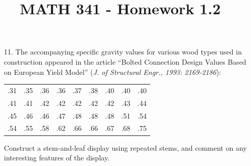 \documentclass[letterpaper,12pt]{article}
\author{}
\title{MATH 341 - Homework 1.2}
\date{} %
\begin{document}
\maketitle

\begin{enumerate}
  \item[11.]
    The accompanying specific gravity values for various wood types used in construction appeared in the article ``Bolted Connection Design Values Based on European Yield Model'' (\textit{J. of Structural Engr., 1993: 2169-2186}):
    \begin{center}
    \begin{tabular}{l l l l l l l l l}
      .31 & .35 & .36 & .36 & .37 & .38 & .40 & .40 & .40 \\
      .41 & .41 & .42 & .42 & .42 & .42 & .42 & .43 & .44 \\
      .45 & .46 & .46 & .47 & .48 & .48 & .48 & .51 & .54 \\
      .54 & .55 & .58 & .62 & .66 & .66 & .67 & .68 & .75
    \end{tabular}
    \end{center}
    Construct a stem-and-leaf display using repeated stems, and comment on any interesting features of the display.


\end{enumerate}
\end{document}
